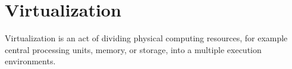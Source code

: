 



\section{Virtualization}
\label{section:virtualization}

Virtualization is an act of dividing physical computing resources, for example central processing units, memory, or storage, into a multiple execution environments.

